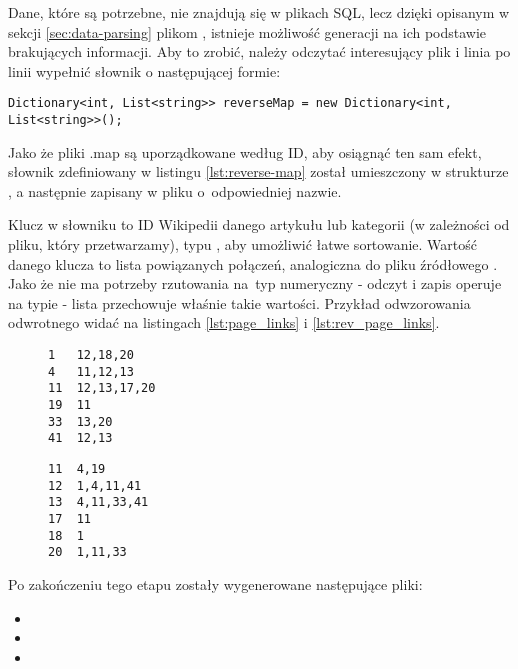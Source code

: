 Dane, które są potrzebne, nie znajdują się w plikach SQL, lecz dzięki opisanym w sekcji \ref{sec:data-parsing} plikom , istnieje możliwość generacji na ich podstawie brakujących informacji. Aby to zrobić, należy odczytać interesujący plik  i linia po linii wypełnić słownik o następującej formie:

\begin{lstlisting}[caption={Słownik przechowujący odwzorowanie odwrotne}, label=lst:reverse-map]
Dictionary<int, List<string>> reverseMap = new Dictionary<int, List<string>>();
\end{lstlisting}

Jako że pliki .map są uporządkowane według ID, aby osiągnąć ten sam efekt, słownik zdefiniowany w listingu \ref{lst:reverse-map} został umieszczony w strukturze , a następnie zapisany w pliku o~odpowiedniej nazwie. 

Klucz w słowniku to ID Wikipedii danego artykułu lub kategorii (w zależności od pliku\linebreak {}, który przetwarzamy), typu , aby umożliwić łatwe sortowanie. Wartość danego klucza to lista powiązanych połączeń, analogiczna do pliku źródłowego . Jako że nie ma potrzeby rzutowania na~typ numeryczny - odczyt i zapis operuje na typie  - lista przechowuje właśnie takie wartości. Przykład odwzorowania odwrotnego widać na listingach \ref{lst:page_links} i \ref{lst:rev_page_links}.

\begin{figure}[!h]
\begin{center}
    \begin{minipage}[c]{0.45\linewidth}
        \begin{lstlisting}[frame=single,caption={Przykładowy fragment pliku \lstinline{pagelinks.map}},label=lst:page_links]
1   12,18,20
4   11,12,13
11  12,13,17,20
19  11
33  13,20
41  12,13
\end{lstlisting}
    \end{minipage}
    \hspace{1em}
    \begin{minipage}[c]{0.45\linewidth}
        \begin{lstlisting}[frame=single,caption={Odwzorowanie odwrotne z listingu \ref{lst:page_links} (fragment \lstinline{R\_pagelinks.map})},label=lst:rev_page_links]
11  4,19
12  1,4,11,41
13  4,11,33,41
17  11
18  1
20  1,11,33
\end{lstlisting}
\end{minipage}
\end{center}
\end{figure}
Po zakończeniu tego etapu zostały wygenerowane następujące pliki:
\begin{itemize}
    \setlength\itemsep{0.2em}
    \item {}
    \item {}
    \item {}
\end{itemize}

